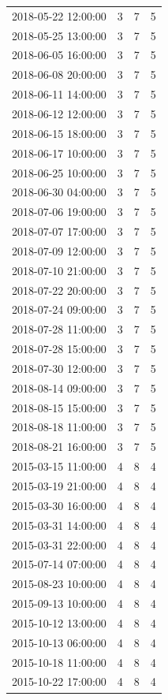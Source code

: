 \begin{tabular}{lrrr}
2018-05-22 12:00:00 & 3 & 7 & 5 \\
2018-05-25 13:00:00 & 3 & 7 & 5 \\
2018-06-05 16:00:00 & 3 & 7 & 5 \\
2018-06-08 20:00:00 & 3 & 7 & 5 \\
2018-06-11 14:00:00 & 3 & 7 & 5 \\
2018-06-12 12:00:00 & 3 & 7 & 5 \\
2018-06-15 18:00:00 & 3 & 7 & 5 \\
2018-06-17 10:00:00 & 3 & 7 & 5 \\
2018-06-25 10:00:00 & 3 & 7 & 5 \\
2018-06-30 04:00:00 & 3 & 7 & 5 \\
2018-07-06 19:00:00 & 3 & 7 & 5 \\
2018-07-07 17:00:00 & 3 & 7 & 5 \\
2018-07-09 12:00:00 & 3 & 7 & 5 \\
2018-07-10 21:00:00 & 3 & 7 & 5 \\
2018-07-22 20:00:00 & 3 & 7 & 5 \\
2018-07-24 09:00:00 & 3 & 7 & 5 \\
2018-07-28 11:00:00 & 3 & 7 & 5 \\
2018-07-28 15:00:00 & 3 & 7 & 5 \\
2018-07-30 12:00:00 & 3 & 7 & 5 \\
2018-08-14 09:00:00 & 3 & 7 & 5 \\
2018-08-15 15:00:00 & 3 & 7 & 5 \\
2018-08-18 11:00:00 & 3 & 7 & 5 \\
2018-08-21 16:00:00 & 3 & 7 & 5 \\
2015-03-15 11:00:00 & 4 & 8 & 4 \\
2015-03-19 21:00:00 & 4 & 8 & 4 \\
2015-03-30 16:00:00 & 4 & 8 & 4 \\
2015-03-31 14:00:00 & 4 & 8 & 4 \\
2015-03-31 22:00:00 & 4 & 8 & 4 \\
2015-07-14 07:00:00 & 4 & 8 & 4 \\
2015-08-23 10:00:00 & 4 & 8 & 4 \\
2015-09-13 10:00:00 & 4 & 8 & 4 \\
2015-10-12 13:00:00 & 4 & 8 & 4 \\
2015-10-13 06:00:00 & 4 & 8 & 4 \\
2015-10-18 11:00:00 & 4 & 8 & 4 \\
2015-10-22 17:00:00 & 4 & 8 & 4 \\

\end{tabular}
